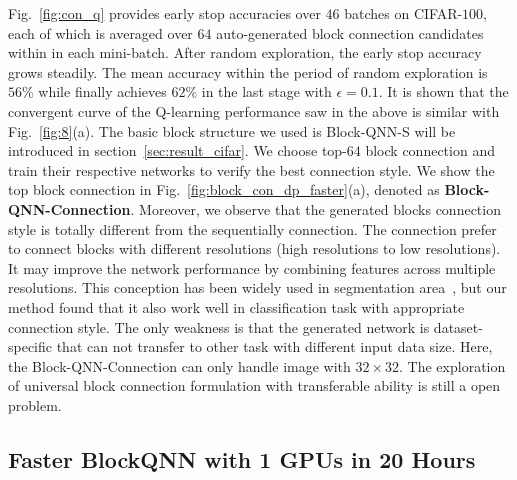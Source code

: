 \documentclass[10pt,journal,compsoc]{IEEEtran}
\begin{document}
Fig.~\ref{fig:con_q} provides early stop accuracies over $46$ batches on CIFAR-$100$, each of which is averaged over $64$ auto-generated block connection candidates within in each mini-batch. After random exploration, the early stop accuracy grows steadily. The mean accuracy within the period of random exploration is $56\%$ while finally achieves $62\%$ in the last stage with $\epsilon=0.1$. It is shown that the convergent curve of the Q-learning performance saw in the above is similar with Fig.~\ref{fig:8}(a).
The basic block structure we used is Block-QNN-S will be introduced in section~\ref{sec:result_cifar}.
We choose top-$64$ block connection and train their respective networks to verify the best connection style. 
We show the top block connection in Fig.~\ref{fig:block_con_dp_faster}(a), denoted as \textbf{Block-QNN-Connection}.
Moreover, we observe that the generated blocks connection style is totally different from the sequentially connection.
The connection prefer to connect blocks with different resolutions (high resolutions to low resolutions). It may improve the network performance by combining features across multiple resolutions. This conception has been widely used in segmentation area~\cite{long2015fully}, but our method found that it also work well in classification task with appropriate connection style.
The only weakness is that the generated network is dataset-specific that can not transfer to other task with different input data size. Here, the Block-QNN-Connection can only handle image with $32\times32$. The exploration of universal block connection formulation with transferable ability is still a open problem. 


\subsection{Faster BlockQNN with 1 GPUs in 20 Hours }
\end{document}
